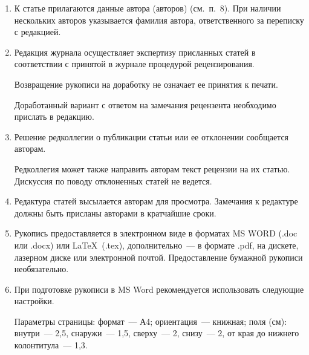 {\begin{enumerate}[1.]
\textit{Подписи авторов: (ф. и. о., дата, адрес)>>.}


Это соглашение может быть представлено в бумажном виде или в виде
отсканированной копии (с~подписями авторов).


Редколлегия вправе запросить у авторов экспертное заключение о возможности
пуб\-ли\-ка\-ции пред\-став\-лен\-ной статьи в открытой печати.\\[-13.5pt]

\item К статье прилагаются данные автора (авторов) (см.\ п.~8). При наличии нескольких
авторов указывается фамилия автора, ответственного за переписку с редакцией.\\[-13.5pt]

\item Редакция журнала осуществляет экспертизу присланных статей в соответствии с
принятой в журнале процедурой рецензирования.

Возвращение рукописи на доработку не означает ее принятия к печати.

Доработанный вариант с ответом на замечания рецензента необходимо прислать в
редакцию.\\[-13.5pt]

\item Решение редколлегии о публикации статьи или ее отклонении сообщается авторам.

Редколлегия может также направить авторам текст рецензии на их статью. Дискуссия по
поводу отклоненных статей не ведется.\\[-13.5pt]


\item Редактура статей высылается авторам для просмотра. Замечания к редактуре должны
быть присланы авторами в кратчайшие сроки.\\[-13.5pt]

\item Рукопись предоставляется в электронном виде в форматах MS WORD (.doc или
.docx) или \LaTeX\  (.tex), дополнительно~--- в формате .pdf, на дискете, лазерном диске
или электронной почтой. Предоставление бумажной рукописи необязательно.\\[-13.5pt]

\item При подготовке рукописи в MS Word рекомендуется использовать следующие
настройки.

Параметры страницы:
формат~--- А4; ориентация~--- книжная; поля (см): внутри~--- 2,5, снаружи~--- 1,5,
сверху~--- 2, снизу~--- 2, от края до нижнего колонтитула~--- 1,3.


\end{enumerate}}
